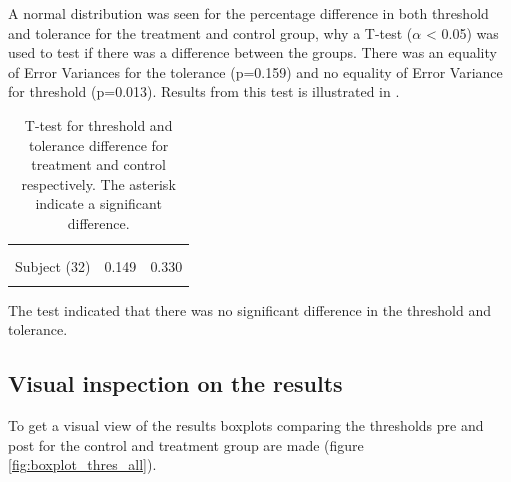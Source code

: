 A normal distribution was seen for the percentage difference in both threshold and tolerance for the treatment and control group, why a T-test ($\alpha$ < 0.05) was used to test if there was a difference between the groups. 
There was an equality of Error Variances for the tolerance (p=0.159) and no equality of Error Variance for threshold (p=0.013).
Results from this test is illustrated in .

\begin{longtable} {l|c|c}
 \rowcolor[HTML]{C0C0C0} 
  \color[HTML]{000000}{} & 
 \multicolumn{1}{c|}{ \color[HTML]{000000}{\textbf{Threshold}}} & \multicolumn{1}{c}{ \color[HTML]{000000}{\textbf{Tolerance}}}  	\\  \rule{0pt}{3ex} 
  \cellcolor[HTML]{C0C0C0}{} &
 \multicolumn{1}{c|}{ \cellcolor[HTML]{C0C0C0}{Difference }} & \multicolumn{1}{|c}{ \cellcolor[HTML]{C0C0C0}{Difference}}  	\\ \hline
Subject (32) & 0.149 & 0.330  \\ \hline
	\caption{T-test for threshold and tolerance difference for treatment and control respectively. The asterisk indicate a significant difference.}	\label{tab:T-test1}
\end{longtable}
\vspace{-.5cm}

The test indicated that there was no significant difference in the threshold and tolerance.

\subsection{Visual inspection on the results}
To get a visual view of the results boxplots comparing the thresholds pre and post for the control and treatment group are made (figure  \ref{fig:boxplot_thres_all}).

